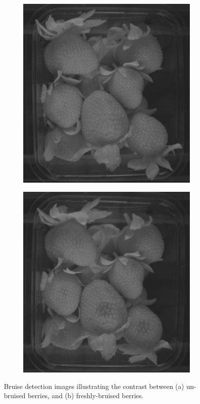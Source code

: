 \documentclass[fleqn,twoside]{article}
\begin{document}
\begin{figure}[ht]
	\centering
	\begin{subfigure}{.5\textwidth}
		\centering
		\includegraphics[width=.8\linewidth]{bruise_ir_1.jpg}
		\caption{}
		\label{fig:bruise_ir_1}
	\end{subfigure}%
	\begin{subfigure}{.5\textwidth}
		\centering
		\includegraphics[width=.8\linewidth]{bruise_ir_2.jpg}
		\caption{}
		\label{fig:bruise_ir_2}
	\end{subfigure}%
	
	\caption{Bruise detection images illustrating the contrast between (a) un-bruised berries, and (b) freshly-bruised berries.}
	\label{}
\end{figure}
\end{document}
